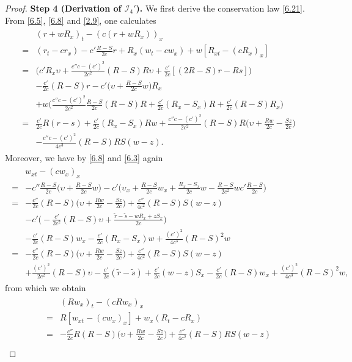 \documentclass[10pt,a4paper]{amsart}
\newcommand{\fr}{\frac}
\begin{document}
\begin{proof}
\textbf{Step 4 (Derivation of $\mathcal{I}_{4}'$).} We first derive the conservation law \eqref{6.21}. From \eqref{6.5}, \eqref{6.8} and \eqref{2.9}, one calculates
\begin{align}\label{6.36}
\begin{split}
&(r+wR_x)_t-(c(r+wR_x))_x \\
=& (r_t-cr_x) -c'\fr{R-S}{2c}r +R_x(w_t-cw_x) +w[R_{xt}-(cR_x)_x] \\
=&\Big(c'R_x\upsilon +\fr{c''c-(c')^2}{2c^2}(R-S)R\upsilon +\fr{c'}{2c}[(2R-S)r-Rs]\Big) \\ &-\fr{c'}{2c}(R-S)r -c'\Big(\upsilon+\fr{R-S}{2c}w\Big)R_x \\
&+w\Big(\fr{c''c-(c')^2}{2c^2}\fr{R-S}{2c}(R-S)R +\fr{c'}{2c}(R_x-S_x)R +\fr{c'}{2c}(R-S)R_x\Big) \\
=&\fr{c'}{2c}R(r-s) +\fr{c'}{2c}(R_x-S_x)Rw +\fr{c''c-(c')^2}{2c^2}(R-S)R\Big(\upsilon+\fr{Rw}{2c}-\fr{Sz}{2c}\Big) \\
&-\fr{c''c-(c')^2}{4c^3}(R-S)RS(w-z).
\end{split}
\end{align}
Moreover, we have by \eqref{6.8} and \eqref{6.3} again
\begin{align*}
\begin{split}
&w_{xt}-(cw_x)_x\\
=&-c''\fr{R-S}{2c}\Big(\upsilon+\fr{R-S}{2c}w\Big)-c'\Big(\upsilon_x+\fr{R-S}{2c}w_x +\fr{R_x-S_x}{2c}w -\fr{R-S}{2c^2}wc'\fr{R-S}{2c}\Big) \\
=&-\fr{c''}{2c}(R-S)\Big(\upsilon+\fr{Rw}{2c}-\fr{Sz}{2c}\Big) +\fr{c''}{4c^2}(R-S)S(w-z) \\
&-c'\Big(-\fr{c'}{2c^2}(R-S)\upsilon +\fr{\tilde{r}-\tilde{s}-wR_x+zS_x}{2c}\Big) \\
&-\fr{c'}{2c}(R-S)w_x -\fr{c'}{2c}(R_x-S_x)w +\fr{(c')^2}{4c^3}(R-S)^2w \\
=& -\fr{c''}{2c}(R-S)\Big(\upsilon+\fr{Rw}{2c}-\fr{Sz}{2c}\Big) +\fr{c''}{4c^2}(R-S)S(w-z) \\
&+\fr{(c')^2}{2c^2}(R-S)\upsilon -\fr{c'}{2c}(\tilde{r}-\tilde{s}) +\fr{c'}{2c}(w-z)S_x -\fr{c'}{2c}(R-S)w_x +\fr{(c')^2}{4c^3}(R-S)^2w,
\end{split}
\end{align*}
from which we obtain
\begin{align}\label{6.37}
\begin{split}
&(Rw_{x})_t-(cRw_x)_x\\
=&R[w_{xt}-(cw_x)_x] +w_x(R_t-cR_x) \\
=&-\fr{c''}{2c}R(R-S)\Big(\upsilon+\fr{Rw}{2c}-\fr{Sz}{2c}\Big) +\fr{c''}{4c^2}(R-S)RS(w-z) \\

\end{split}
\end{align}
\end{proof}
\end{document}
